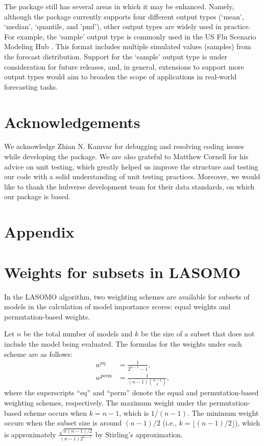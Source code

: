 \documentclass[
  article,
  shortnames,
  notitle]{jss}
\begin{document}
The  package still has several areas in which it
may be enhanced. Namely, although the package currently supports four
different output types (`mean', `median', `quantile, and 'pmf'), other
output types are widely used in practice. For example, the `sample'
output type is commonly used in the US Flu Scenario Modeling Hub
\citep{FluSMH}. This format includes multiple simulated values (samples)
from the forecast distribution. Support for the `sample' output type is
under consideration for future releases, and, in general, extensions to
support more output types would aim to broaden the scope of applications
in real-world forecasting tasks.

\section*{Acknowledgements}\label{acknowledgements}

We acknowledge Zhian N. Kamvar for debugging and resolving coding issues
while developing the package. We are also grateful to Matthew Cornell
for his advice on unit testing, which greatly helped us improve the
structure and testing our code with a solid understanding of unit
testing practices. Moreover, we would like to thank the hubverse
development team for their data standards, on which our package is
based.

\section*{Appendix}\label{appendix}

\appendix

\section{Weights for subsets in LASOMO}\label{sec:appendix}

In the LASOMO algorithm, two weighting schemes are available for subsets
of models in the calculation of model importance scores: equal weights
and permutation-based weights.

Let \(n\) be the total number of models and \(k\) be the size of a
subset that does not include the model being evaluated. The formulas for
the weights under each scheme are as follows: \begin{align*}
w^{\text{eq}} &= \frac{1}{2^{n-1}-1}, \\
w^{\text{perm}} &= \frac{1}{(n-1)\binom{n-1}{k}},
\end{align*} where the superscripts ``eq'' and ``perm'' denote the equal
and permutation-based weighting schemes, respectively. The maximum
weight under the permutation-based scheme occurs when \(k=n-1\), which
is \({1}/{(n-1)}\). The minimum weight occurs when the subset size is
around \({(n-1)}/{2}\) (i.e., \(k=\lfloor (n-1)/2 \rfloor\)), which is
approximately \(\displaystyle\frac{\sqrt{\pi(n-1)/2}}{(n-1)2^{n-1}}\) by
Stirling's approximation.
\end{document}
